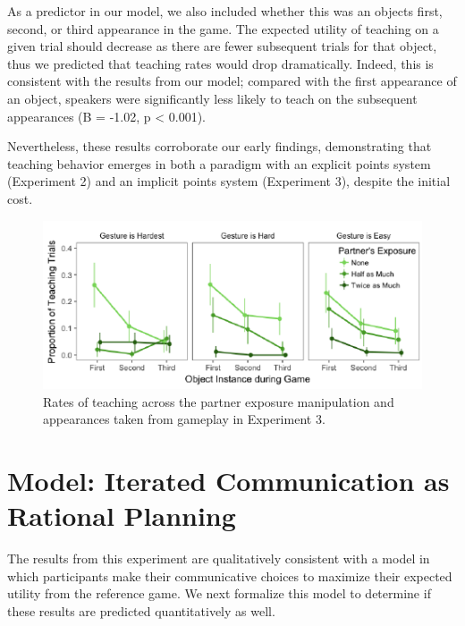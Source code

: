 \documentclass[10pt, letterpaper]{article}
\newenvironment{CodeChunk}{}{}
\begin{document}
As a predictor in our model, we also included whether this was an
objects first, second, or third appearance in the game. The expected
utility of teaching on a given trial should decrease as there are fewer
subsequent trials for that object, thus we predicted that teaching rates
would drop dramatically. Indeed, this is consistent with the results
from our model; compared with the first appearance of an object,
speakers were significantly less likely to teach on the subsequent
appearances (B = -1.02, p \textless{} 0.001).

Nevertheless, these results corroborate our early findings,
demonstrating that teaching behavior emerges in both a paradigm with an
explicit points system (Experiment 2) and an implicit points system
(Experiment 3), despite the initial cost.

\begin{CodeChunk}
\begin{figure}[H]

{\centering \includegraphics{figs/imp_teach-1} 

}

\caption[Rates of teaching across the partner exposure manipulation and appearances taken from gameplay in Experiment 3]{Rates of teaching across the partner exposure manipulation and appearances taken from gameplay in Experiment 3.}\label{fig:imp_teach}
\end{figure}
\end{CodeChunk}

\section{Model: Iterated Communication as Rational
Planning}\label{model-iterated-communication-as-rational-planning}

The results from this experiment are qualitatively consistent with a
model in which participants make their communicative choices to maximize
their expected utility from the reference game. We next formalize this
model to determine if these results are predicted quantitatively as
well.
\end{document}
